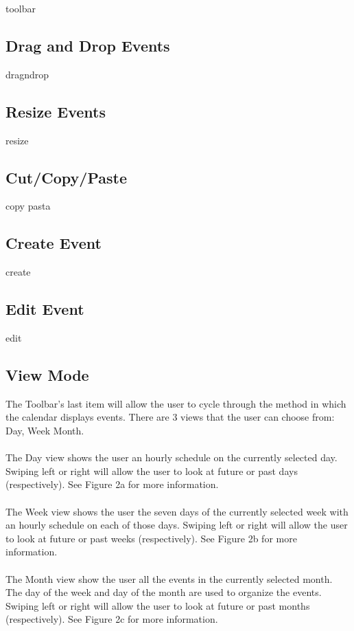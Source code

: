 \documentclass{scrreprt}
\begin{document}
toolbar

\subsection{Drag and Drop Events}

dragndrop

\subsection{Resize Events}

resize

\subsection{Cut/Copy/Paste}

copy pasta

\subsection{Create Event}

create

\subsection{Edit Event}

edit

\subsection{View Mode}

The Toolbar's last item will allow the user to cycle through the method in which the calendar displays events.  There are 3 views that the user can choose from: Day, Week Month. \\
\\
The Day view shows the user an hourly schedule on the currently selected day.  Swiping left or right will allow the user to look at future or past days (respectively). See Figure 2a for more information. \\
\\
The Week view shows the user the seven days of the currently selected week with an hourly schedule on each of those days.  Swiping left or right will allow the user to look at future or past weeks (respectively). See Figure 2b for more information. \\
\\
The Month view show the user all the events in the currently selected month.  The day of the week and day of the month are used to organize the events.  Swiping left or right will allow the user to look at future or past months (respectively).  See Figure 2c for more information. \\
\\
\end{document}
